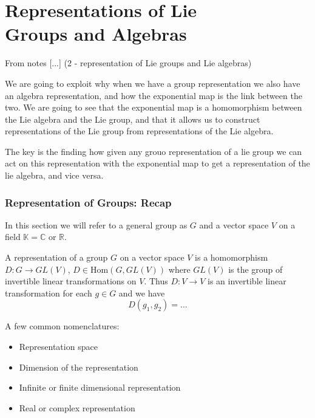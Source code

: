 \chapter[Representations of Lie Groups and Algebras]{Representations of Lie\\Groups and Algebras}

From notes [...] (2 - representation of Lie groups and Lie algebras)

We are going to exploit why when we have a group representation we also have an algebra representation, and how the exponential map is the link between the two. We are going to see that the exponential map is a homomorphism between the Lie algebra and the Lie group, and that it allows us to construct representations of the Lie group from representations of the Lie algebra.

The key is the finding how given any grouo representation of a lie group we can act on this representation with the exponential map to get a representation of the lie algebra, and vice versa.

\subsection{Representation of Groups: Recap}

In this section we will refer to a general group as \(G\) and a vector space \(V\) on a field \(\mathbb{K} = \mathbb{C}\) or \(\mathbb{R}\).

\begin{definition}
    A representation of a group \(G\) on a vector space \(V\) is a homomorphism \(D: G \to GL(V)\), \(D \in \text{Hom}(G,GL(V))\) where \(GL(V)\) is the group of invertible linear transformations on \(V\). Thus \(D : V \to V\) is an invertible linear transformation for each \(g \in G\) and we have
    \[
        D(g_1,g_2) = \dots
    \]
\end{definition}

A few common nomenclatures:
\begin{itemize}
    \item Representation space
    \item Dimension of the representation
    \item Infinite or finite dimensional representation
    \item Real or complex representation
\end{itemize}

